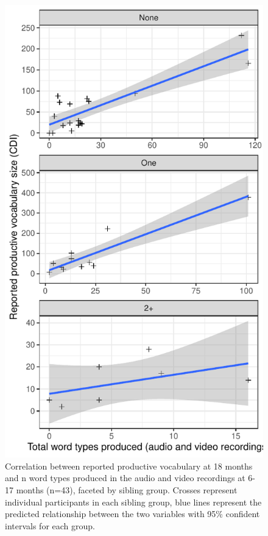 \documentclass[
  man,mask,floatsintext]{apa6}
\begin{document}
\begin{figure}
\centering
\includegraphics{SiblingsStudy_SupplementaryData-anon-revisions_files/figure-latex/Figure-cdi-types-1.pdf}
\caption{\label{fig:Figure-cdi-types}Correlation between reported productive vocabulary at 18 months and n word types produced in the audio and video recordings at 6-17 months (n=43), faceted by sibling group. Crosses represent individual participants in each sibling group, blue lines represent the predicted relationship between the two variables with 95\% confident intervals for each group.}
\end{figure}
\end{document}
